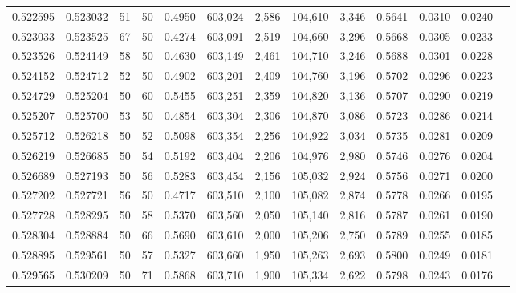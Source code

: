 \begin{tabular}{rrrrrrrrrrrrr}
0.522595 & 0.523032 &    51 &  50 &                                     0.4950 & 603,024 &   2,586 & 104,610 &   3,346 & 0.5641 & 0.0310 & 0.0240 \\
0.523033 & 0.523525 &    67 &  50 &                                     0.4274 & 603,091 &   2,519 & 104,660 &   3,296 & 0.5668 & 0.0305 & 0.0233 \\
0.523526 & 0.524149 &    58 &  50 &                                     0.4630 & 603,149 &   2,461 & 104,710 &   3,246 & 0.5688 & 0.0301 & 0.0228 \\
0.524152 & 0.524712 &    52 &  50 &                                     0.4902 & 603,201 &   2,409 & 104,760 &   3,196 & 0.5702 & 0.0296 & 0.0223 \\
0.524729 & 0.525204 &    50 &  60 &                                     0.5455 & 603,251 &   2,359 & 104,820 &   3,136 & 0.5707 & 0.0290 & 0.0219 \\
0.525207 & 0.525700 &    53 &  50 &                                     0.4854 & 603,304 &   2,306 & 104,870 &   3,086 & 0.5723 & 0.0286 & 0.0214 \\
0.525712 & 0.526218 &    50 &  52 &                                     0.5098 & 603,354 &   2,256 & 104,922 &   3,034 & 0.5735 & 0.0281 & 0.0209 \\
0.526219 & 0.526685 &    50 &  54 &                                     0.5192 & 603,404 &   2,206 & 104,976 &   2,980 & 0.5746 & 0.0276 & 0.0204 \\
0.526689 & 0.527193 &    50 &  56 &                                     0.5283 & 603,454 &   2,156 & 105,032 &   2,924 & 0.5756 & 0.0271 & 0.0200 \\
0.527202 & 0.527721 &    56 &  50 &                                     0.4717 & 603,510 &   2,100 & 105,082 &   2,874 & 0.5778 & 0.0266 & 0.0195 \\
0.527728 & 0.528295 &    50 &  58 &                                     0.5370 & 603,560 &   2,050 & 105,140 &   2,816 & 0.5787 & 0.0261 & 0.0190 \\
0.528304 & 0.528884 &    50 &  66 &                                     0.5690 & 603,610 &   2,000 & 105,206 &   2,750 & 0.5789 & 0.0255 & 0.0185 \\
0.528895 & 0.529561 &    50 &  57 &                                     0.5327 & 603,660 &   1,950 & 105,263 &   2,693 & 0.5800 & 0.0249 & 0.0181 \\
0.529565 & 0.530209 &    50 &  71 &                                     0.5868 & 603,710 &   1,900 & 105,334 &   2,622 & 0.5798 & 0.0243 & 0.0176 \\

\end{tabular}
